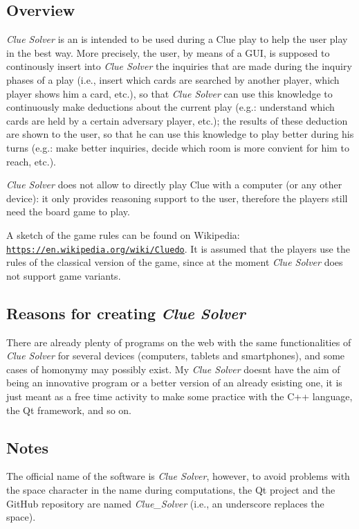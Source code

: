 \subsection*{Overview}

{\itshape Clue Solver} is an is intended to be used during a Clue play to help the user play in the best way. More precisely, the user, by means of a G\+UI, is supposed to continously insert into {\itshape Clue Solver} the inquiries that are made during the inquiry phases of a play (i.\+e., insert which cards are searched by another player, which player shows him a card, etc.), so that {\itshape Clue Solver} can use this knowledge to continuously make deductions about the current play (e.\+g.\+: understand which cards are held by a certain adversary player, etc.); the results of these deduction are shown to the user, so that he can use this knowledge to play better during his turns (e.\+g.\+: make better inquiries, decide which room is more convient for him to reach, etc.).

{\itshape Clue Solver} does not allow to directly play Clue with a computer (or any other device)\+: it only provides reasoning support to the user, therefore the players still need the board game to play.

A sketch of the game rules can be found on Wikipedia\+: \href{https://en.wikipedia.org/wiki/Cluedo}{\tt https\+://en.\+wikipedia.\+org/wiki/\+Cluedo}. It is assumed that the players use the rules of the classical version of the game, since at the moment {\itshape Clue Solver} does not support game variants.

\subsection*{Reasons for creating {\itshape Clue Solver}}

There are already plenty of programs on the web with the same functionalities of {\itshape Clue Solver} for several devices (computers, tablets and smartphones), and some cases of homonymy may possibly exist. My {\itshape Clue Solver} doesn\textquotesingle{}t have the aim of being an innovative program or a better version of an already esisting one, it is just meant as a free time activity to make some practice with the C++ language, the Qt framework, and so on.

\subsection*{Notes}

The official name of the software is {\itshape Clue Solver}, however, to avoid problems with the space character in the name during computations, the Qt project and the Git\+Hub repository are named {\itshape Clue\+\_\+\+Solver} (i.\+e., an underscore replaces the space). 